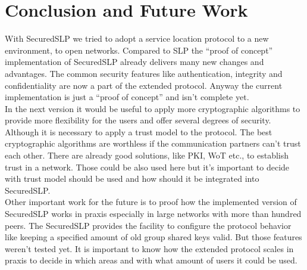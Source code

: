 \section{Conclusion and Future Work}
With SecuredSLP we tried to adopt a service location protocol to a new environment, to open networks. Compared to SLP the ``proof of concept'' implementation of SecuredSLP already delivers many new changes and advantages. The common security features like authentication, integrity and confidentiality are now a part of the extended protocol. Anyway the current implementation is just a ``proof of concept'' and isn't complete yet.\\
In the next version it would be useful to apply more cryptographic algorithms to provide more flexibility for the users and offer several degrees of security. Although it is necessary to apply a trust model to the protocol. The best cryptographic algorithms are worthless if the communication partners can't trust each other. There are already good solutions, like PKI, WoT etc., to establish trust in a network. Those could be also used here but it's important to decide with trust model should be used and how should it be integrated into SecuredSLP.\\  
Other important work for the future is to proof how the implemented version of SecuredSLP works in praxis especially in large networks with more than hundred peers. The SecuredSLP provides the facility to configure the protocol behavior like keeping a specified amount of old group shared keys valid. But those features weren't tested yet. It is important to know how the extended protocol scales in praxis to decide in which areas and with what amount of users it could be used.